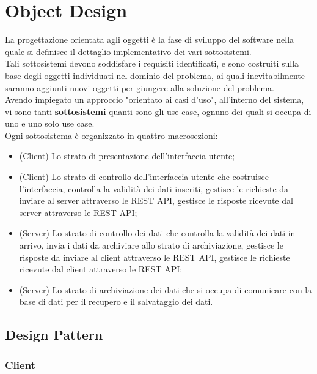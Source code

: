 
\chapter{Object Design}
    La progettazione orientata agli oggetti è la fase di sviluppo del software nella quale si definisce il dettaglio implementativo dei vari sottosistemi. \\
    Tali sottosistemi devono soddisfare i requisiti identificati, e sono costruiti sulla base degli oggetti individuati nel dominio del problema, ai quali inevitabilmente saranno aggiunti nuovi oggetti per giungere alla soluzione del problema. \\
    Avendo impiegato un approccio "orientato ai casi d'uso", all'interno del sistema, vi sono tanti \textbf{sottosistemi} quanti sono gli use case, ognuno dei quali si occupa di uno e uno solo use case. \\
    Ogni sottosistema è organizzato in quattro macrosezioni:
    
    \begin{itemize}
        \item (Client) Lo strato di presentazione dell'interfaccia utente;
        \item (Client) Lo strato di controllo dell'interfaccia utente che costruisce l'interfaccia, controlla la validità dei dati inseriti, gestisce le richieste da inviare al server attraverso le REST API, gestisce le risposte ricevute dal server attraverso le REST API;
        \item (Server) Lo strato di controllo dei dati che controlla la validità dei dati in arrivo, invia i dati da archiviare allo strato di archiviazione, gestisce le risposte da inviare al client attraverso le REST API, gestisce le richieste ricevute dal client attraverso le REST API;
        \item (Server) Lo strato di archiviazione dei dati che si occupa di comunicare con la base di dati per il recupero e il salvataggio dei dati.
    \end{itemize}

    \clearpage

    \section{Design Pattern}
        \subsection{Client}

